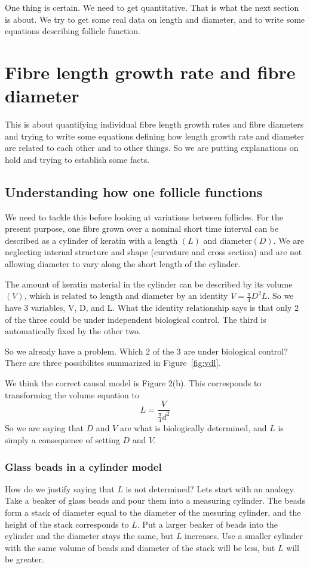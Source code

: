 \documentclass[titlepage]{article}  %
\begin{document}
One thing is certain. We need to get quantitative.  That is what the next section is about. We try to get some real data on length and diameter, and to write some equations describing follicle function.

\section{Fibre length growth rate and fibre diameter}
This is about quantifying individual fibre length growth rates and fibre diameters and trying to write some equations defining how length growth rate and diameter are related to each other and to other things. So we are putting explanations on hold and trying to establish some facts.

\subsection{Understanding how one follicle functions}
We need to tackle this before looking at variations between follicles. For the present purpose, one fibre grown over a nominal short time interval can be described as a cylinder of keratin with a length $(L)$ and diameter$(D)$. We are neglecting internal structure and shape (curvature and cross section) and are not allowing diameter to vary along the short length of the cylinder. 

The amount of keratin material in the cylinder can be described by its volume $(V)$, which is related to length and diameter by an identity $V = \frac{\pi}{4} D^{2} L$. So we have 3 variables, V, D, and L. What the identity relationship says is that only 2 of the three could be under independent biological control.  The third is automatically fixed by the other two. 

So we already have a problem. Which 2 of the 3 are under biological control?  There are three possibilites summarized in Figure~\ref{fig:vdl}.

We think the correct causal model is Figure 2(b). This corresponds to transforming the volume equation to
\begin{displaymath}
L = \frac{V}{\frac{\pi}{4} d^{2}}
\end{displaymath}
So we are saying that $D$ and $V$ are what is biologically determined, and $L$ is simply a consequence of setting $D$ and $V$. 

\subsubsection{Glass beads in a cylinder model}
How do we justify saying that $L$ is not determined? Lets start with an analogy. Take a beaker of glass beads and pour them into a measuring cylinder. The beads form a stack of diameter equal to the diameter of the mesuring cylinder, and the height of the stack corresponds to $L$. Put a larger beaker of beads into the cylinder and the diameter stays the same, but $L$ increases. Use a smaller cylinder with the same volume of beads and diameter of the stack will be less, but $L$ will be greater. 
\end{document}

